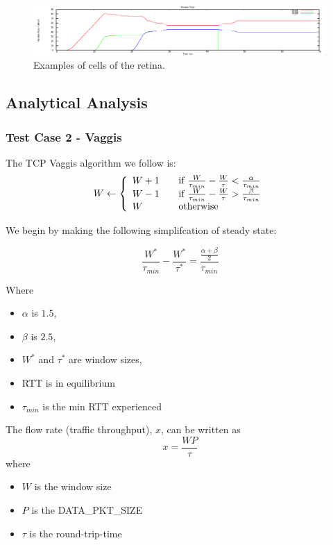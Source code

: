 \documentclass[12pt]{article}
\begin{document}
\begin{figure}[t]
\centering \includegraphics[scale=.35]{figures/Test2_Vegas/window_size.png}
\caption{Examples of cells of the retina.}
\label{fig:test2_vegas_window_size}
\end{figure}


\subsection{Analytical Analysis}
\subsubsection{Test Case 2 - Vaggis}


The TCP Vaggis algorithm we follow is:
\[ W \leftarrow \left\{
  \begin{array}{l l}
    W+1 & \quad \text{if }\frac{W}{\tau_{min}} - \frac{W}{\tau} < \frac{\alpha}{\tau_{min}}\\
    W-1 & \quad \text{if }\frac{W}{\tau_{min}} - \frac{W}{\tau} > \frac{\beta}{\tau_{min}}\\
    W & \quad \text{otherwise}\\
  \end{array} \right.\]

We begin by making the following simplifcation of steady state:

$$ \frac{W^*}{\tau_{min}} - \frac{W^*}{\tau^*} = \frac{\frac{\alpha + \beta}{2}}{\tau_{min}} $$

Where 
\begin{itemize}
\item $\alpha$ is $1.5$,
\item $\beta$ is $2.5$,
\item $W^*$ and $\tau^*$ are window sizes,
\item RTT is in equilibrium
\item $\tau_{min}$ is the min RTT experienced
\end{itemize}

The flow rate (traffic throughput), $x$, can be written as $$x=\frac{WP}{\tau}$$ where
\begin{itemize}
\item $W$ is the window size
\item $P$ is the DATA\_PKT\_SIZE
\item $\tau$ is the round-trip-time
\end{itemize}
\end{document}
